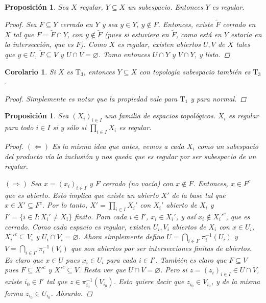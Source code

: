 \documentclass[12pt]{book}
\newtheorem{prop}[teo]{Proposición}
\newtheorem{cor}[teo]{Corolario}
\theoremstyle{definition}
\let\emptyset\varnothing
\begin{document}
\begin{prop}
Sea $X$ regular, $Y\subseteq X$ un subespacio. Entonces $Y$ es regular.
\begin{proof}
Sea $F\subseteq Y$ cerrado en $Y$ y sea $y\in Y$, $y\notin F$. Entonces, existe $\tilde{F}$ cerrado en $X$ tal que $F=\tilde{F}\cap Y$, con $y\notin \tilde{F}$ (pues si estuviera en $\tilde{F}$, como está en $Y$ estaría en la intersección, que es $F$). Como $X$ es regular, existen abiertos $U,V$ de $X$ tales que $y\in U$, $\tilde{F}\subseteq V$ y $U\cap V=\emptyset$. Tomo entonces $U\cap Y$ y $V\cap Y$, y listo.
\end{proof}
\end{prop}

\begin{cor}
Si $X$ es $\mathrm{T}_3$, entonces $Y\subseteq X$ con topología subespacio también es $\mathrm{T}_3$.
\begin{proof}
Simplemente es notar que la propiedad vale para $\mathrm{T}_1$ y para normal.
\end{proof}
\end{cor}

\begin{prop}
Sea $(X_i)_{i\in I}$ una familia de espacios topológicos. $X_i$ es regular para todo $i\in I$ si y sólo si $\displaystyle\prod_{i\in I}X_i$ es regular.
\begin{proof}
$(\Longleftarrow)$ Es la misma idea que antes, vemos a cada $X_i$ como un subespacio del producto vía la inclusión y nos queda que es regular por ser subespacio de un regular.

$(\Longrightarrow)$ Sea $x=(x_i)_{i\in I}$ y $F$ cerrado (no vacío) con $x\notin F$. Entonces, $x\in F^c$ que es abierto. Esto implica que existe un abierto $X'$ de la base tal que $x\in X'\subseteq F^c$. Por lo tanto, $X' = \displaystyle\prod_{i\in I} X_i'$ con $X_i'$ abierto de $X_i$ y $I' = \{i\in I : X_i'\neq X_i\}$ finito. Para cada $i\in I'$, $x_i\in X_i'$, y así $x_i\notin X_i'^c$, que es cerrado. Como cada espacio es regular, existen $U_i,V_i$ abiertos de $X_i$ con $x\in U_i$, $X_i'^c\subseteq V_i$ y $U_i\cap V_i = \emptyset$. Ahora simplemente defino $U = \displaystyle\bigcap_{i\in I'} \pi_i^{-1}(U_i)$ y $V=\displaystyle\bigcap_{i\in I'} \pi_i^{-1}(V_i)$ que son abiertos por ser intersecciones finitas de abiertos. Es claro que $x\in U$ pues $x_i\in U_i$ para cada $i\in I'$. También es claro que $F\subseteq V$ pues $F\subseteq X'^c$ y $X'^c\subseteq V$. Resta ver que $U\cap V = \emptyset$. Pero si $z = (z_i)_{i\in I} \in U\cap V$, existe $i_0\in I'$ tal que $z\in \pi_{i_0}^{-1}(V_{i_0})$. Esto quiere decir que $z_{i_0}\in V_{i_0}$, y de la misma forma $z_{i_0}\in U_{i_0}$. Absurdo. 
\end{proof}
\end{prop}
\end{document}
